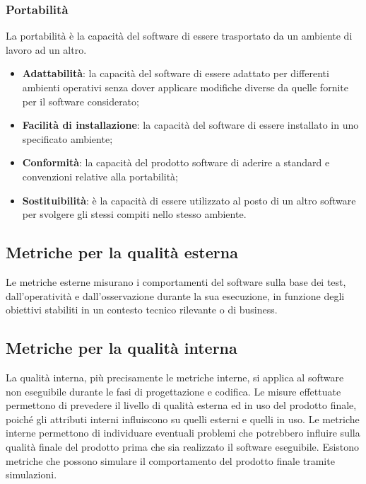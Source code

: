\subsubsection{Portabilità}
La portabilità è la capacità del software di essere trasportato da un ambiente di lavoro ad un altro.
\begin{itemize}

    \item \textbf{Adattabilità}: la capacità del software di essere adattato per differenti ambienti operativi senza dover applicare modifiche diverse da quelle fornite per il software considerato;
    
    \item \textbf{Facilità di installazione}: la capacità del software di essere installato in uno specificato ambiente;
    
    \item \textbf{Conformità}: la capacità del prodotto software di aderire a standard e convenzioni relative alla portabilità;
    
    \item \textbf{Sostituibilità}: è la capacità di essere utilizzato al posto di un altro software per svolgere gli stessi compiti nello stesso ambiente.
    
\end{itemize}

\subsection{Metriche per la qualità esterna}
Le metriche esterne misurano i comportamenti del software sulla base dei test, dall'operatività e dall'osservazione durante la sua esecuzione, in funzione degli obiettivi stabiliti in un contesto tecnico rilevante o di business.

\subsection{Metriche per la qualità interna}
La qualità interna, più precisamente le metriche interne, si applica al software non eseguibile durante le fasi di progettazione e codifica. Le misure effettuate permettono di prevedere il livello di qualità esterna ed in uso del prodotto finale, poiché gli attributi interni influiscono su quelli esterni e quelli in uso. Le metriche interne permettono di individuare eventuali problemi che potrebbero influire sulla qualità finale del prodotto prima che sia realizzato il software eseguibile. Esistono metriche che possono simulare il comportamento del prodotto finale tramite simulazioni.

